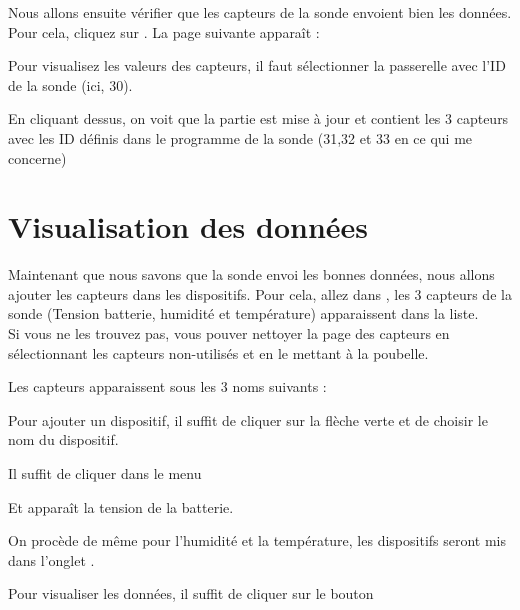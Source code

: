 Nous allons ensuite vérifier que les capteurs de la sonde envoient bien les données. Pour cela, cliquez sur .
La page suivante apparaît : 


Pour visualisez les valeurs des capteurs, il faut sélectionner la passerelle avec l'ID de la sonde (ici, 30).


En cliquant dessus, on voit que la partie  est mise à jour et contient les 3 capteurs avec les ID définis dans le programme de la sonde (31,32 et 33 en ce qui me concerne)



\section{Visualisation des données}

Maintenant que nous savons que la sonde envoi les bonnes données, nous allons ajouter les capteurs dans les dispositifs.
Pour cela, allez dans , les 3 capteurs de la sonde (Tension batterie, humidité et température) apparaissent dans la liste.\\
Si vous ne les trouvez pas, vous pouver nettoyer la page des capteurs en sélectionnant les capteurs non-utilisés et en le mettant à la poubelle.


Les capteurs apparaissent sous les 3 noms suivants : 


Pour ajouter un dispositif, il suffit de cliquer sur la flèche verte et de choisir le nom du dispositif.



Il suffit de cliquer dans le menu 


Et apparaît la tension de la batterie.


On procède de même pour l'humidité et la température, les dispositifs seront mis dans l'onglet  .



Pour visualiser les données, il suffit de cliquer sur le bouton 


